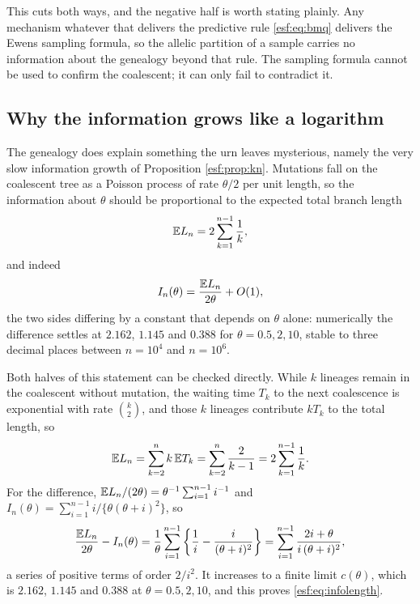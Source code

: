 This cuts both ways, and the negative half is worth stating plainly. Any mechanism
whatever that delivers the predictive rule \eqref{esf:eq:bmq} delivers the Ewens sampling
formula, so the allelic partition of a sample carries no information about the
genealogy beyond that rule. The sampling formula cannot be used to confirm the
coalescent; it can only fail to contradict it.

\subsection{Why the information grows like a logarithm}

The genealogy does explain something the urn leaves mysterious, namely the very slow
information growth of Proposition \ref{esf:prop:kn}. Mutations fall on the coalescent tree
as a Poisson process of rate $\theta/2$ per unit length, so the information about
$\theta$ should be proportional to the expected total branch length
\[
\mathbb{E} L_n = 2 \sum_{k=1}^{n-1} \frac{1}{k} ,
\]
and indeed
\begin{equation}
I_n(\theta) = \frac{\mathbb{E} L_n}{2 \theta} + O(1) ,
\label{esf:eq:infolength}
\end{equation}
the two sides differing by a constant that depends on $\theta$ alone: numerically the
difference settles at $2.162$, $1.145$ and $0.388$ for $\theta = 0.5, 2, 10$, stable
to three decimal places between $n = 10^{4}$ and $n = 10^{6}$.

Both halves of this statement can be checked directly. While $k$ lineages remain in
the coalescent without mutation, the waiting time $T_k$ to the next coalescence is
exponential with rate $\binom{k}{2}$, and those $k$ lineages contribute $k T_k$ to the
total length, so
\[
\mathbb{E} L_n = \sum_{k=2}^{n} k \, \mathbb{E} T_k = \sum_{k=2}^{n} \frac{2}{k-1}
= 2 \sum_{k=1}^{n-1} \frac{1}{k} .
\]
For the difference, $\mathbb{E} L_n/(2\theta) = \theta^{-1}\sum_{i=1}^{n-1} i^{-1}$ and
$I_n(\theta) = \sum_{i=1}^{n-1} i/\{\theta(\theta+i)^{2}\}$, so
\begin{equation}
\frac{\mathbb{E} L_n}{2\theta} - I_n(\theta)
= \frac{1}{\theta}\sum_{i=1}^{n-1} \left\{ \frac{1}{i} - \frac{i}{(\theta+i)^{2}} \right\}
= \sum_{i=1}^{n-1} \frac{2i + \theta}{i\,(\theta+i)^{2}} ,
\label{esf:eq:infogap}
\end{equation}
a series of positive terms of order $2/i^{2}$. It increases to a finite limit
$c(\theta)$, which is $2.162$, $1.145$ and $0.388$ at $\theta = 0.5, 2, 10$, and this
proves \eqref{esf:eq:infolength}.

